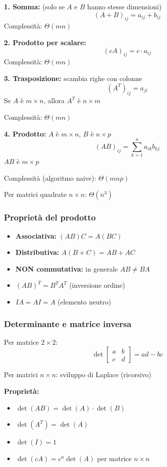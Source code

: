 \textbf{1. Somma:} (solo se $A$ e $B$ hanno stesse dimensioni)
\[
(A + B)_{ij} = a_{ij} + b_{ij}
\]
Complessità: $\Theta(mn)$

\textbf{2. Prodotto per scalare:}
\[
(cA)_{ij} = c \cdot a_{ij}
\]
Complessità: $\Theta(mn)$

\textbf{3. Trasposizione:} scambia righe con colonne
\[
(A^T)_{ij} = a_{ji}
\]
Se $A$ è $m \times n$, allora $A^T$ è $n \times m$

Complessità: $\Theta(mn)$

\textbf{4. Prodotto:} $A$ è $m \times n$, $B$ è $n \times p$
\[
(AB)_{ij} = \sum_{k=1}^{n} a_{ik} b_{kj}
\]
$AB$ è $m \times p$

Complessità (algoritmo naive): $\Theta(mnp)$

Per matrici quadrate $n \times n$: $\Theta(n^3)$

\subsubsection{Proprietà del prodotto}

\begin{itemize}
	\item \textbf{Associativa:} $(AB)C = A(BC)$
	\item \textbf{Distributiva:} $A(B + C) = AB + AC$
	\item \textbf{NON commutativa:} in generale $AB \neq BA$
	\item $(AB)^T = B^T A^T$ (inversione ordine)
	\item $IA = AI = A$ (elemento neutro)
\end{itemize}

\subsubsection{Determinante e matrice inversa}

\begin{definizione}[Determinante]
	Per matrice $2 \times 2$:
	\[
	\det \begin{bmatrix}
		a & b \\
		c & d
	\end{bmatrix} = ad - bc
	\]
	
	Per matrici $n \times n$: sviluppo di Laplace (ricorsivo)
\end{definizione}

\textbf{Proprietà:}
\begin{itemize}
	\item $\det(AB) = \det(A) \cdot \det(B)$
	\item $\det(A^T) = \det(A)$
	\item $\det(I) = 1$
	\item $\det(cA) = c^n \det(A)$ per matrice $n \times n$
\end{itemize}

